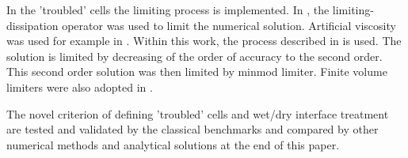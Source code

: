 In the 'troubled' cells the limiting process is implemented. In \cite{JAFFRE1995,Ambati2007452}, the limiting-dissipation operator was used to limit the numerical solution. Artificial viscosity was used for example in \cite{cesenek2013, bublik2011,Bublik2015329}. Within this work, the process described in \cite{Cockburn1989b} is used. The solution is limited by decreasing of the order of accuracy to the second order. This second order solution was then limited by minmod limiter. Finite volume limiters were also adopted in \cite{yang2009}.



The novel criterion of defining 'troubled' cells and wet/dry interface treatment are tested and validated by the classical benchmarks and compared by other numerical methods and analytical solutions at the end of this paper.